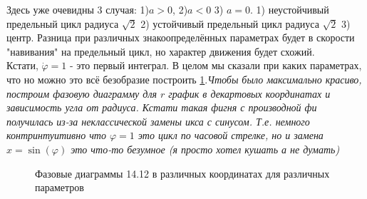 \documentclass{article}
\begin{document}
Здесь уже очевидны 3 случая: 1)$a>0$, 2)$a<0$ 3) $a=0$. 1) неустойчивый предельный цикл радиуса $\sqrt 2$ 2) устойчивый 
предельный цикл радиуса $\sqrt 2$  3) центр. Разница при различных знакоопределённых параметрах будет в скорости "навивания" на предельный цикл, но характер движения будет схожий.\\
 Кстати, $\dot{\varphi}=1$ - это первый интеграл. В целом мы сказали при каких параметрах, что но можно это всё безобразие построить \ref{fig:14.12}.\textcolor[rgb]{0.480469,0.566406,0.480469}{\textit{Чтобы было максимально красиво, построим фазовую диаграмму для $r$ график в декартовых координатах и зависимость угла от радиуса. Кстати такая фигня с производной фи получилась из-за неклассической замены икса с синусом. Т.е. немного контринтуитивно что $\varphi =1$ это цикл по часовой стрелке, но и замена $x=\sin{(\varphi)}$ это что-то безумное (я просто хотел кушать а не думать)}}
\begin{figure}[h!]
\caption{Фазовые диаграммы 14.12 в различных координатах для различных параметров}
\label{fig:14.12}
\end{figure}                                                                 
\end{document}
